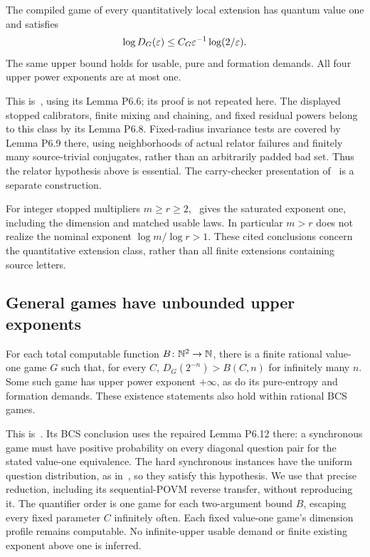 \begin{theorem}\label{thm:localcap}
The compiled game of every quantitatively local extension has quantum value one and satisfies
\[
 \log D_G(\varepsilon)\le C_G\varepsilon^{-1}\log(2/\varepsilon).
\]
The same upper bound holds for usable, pure and formation demands. All four upper power exponents are at most one.
\end{theorem}
This is~\cite[Theorem P6.7]{UP}, using its Lemma P6.6; its proof is not repeated here. The displayed stopped calibrators, finite mixing and chaining, and fixed residual powers belong to this class by its Lemma P6.8. Fixed-radius invariance tests are covered by Lemma P6.9 there, using neighborhoods of actual relator failures and finitely many source-trivial conjugates, rather than an arbitrarily padded bad set. Thus the relator hypothesis above is essential. The carry-checker presentation of~\cite[Section Q1]{UP} is a separate construction.

For integer stopped multipliers $m\ge r\ge2$,~\cite[Corollary P6.10]{UP} gives the saturated exponent one, including the dimension and matched usable laws. In particular $m>r$ does not realize the nominal exponent $\log m/\log r>1$. These cited conclusions concern the quantitative extension class, rather than all finite extensions containing source letters.

\subsection{General games have unbounded upper exponents}
\begin{theorem}\label{thm:unbounded}
For each total computable function $B\colon\mathbb N^2\to\mathbb N$, there is a finite rational value-one game $G$ such that, for every $C$, $D_G(2^{-n})>B(C,n)$ for infinitely many $n$. Some such game has upper power exponent $+\infty$, as do its pure-entropy and formation demands. These existence statements also hold within rational BCS games.
\end{theorem}
This is~\cite[Theorem P6.11]{UP}. Its BCS conclusion uses the repaired Lemma P6.12 there: a synchronous game must have positive probability on every diagonal question pair for the stated value-one equivalence. The hard synchronous instances have the uniform question distribution, as in~\cite[Theorem 1.6 and the proof of Lemma 6.7]{MNY}, so they satisfy this hypothesis. We use that precise reduction, including its sequential-POVM reverse transfer, without reproducing it. The quantifier order is one game for each two-argument bound $B$, escaping every fixed parameter $C$ infinitely often. Each fixed value-one game's dimension profile remains computable. No infinite-upper usable demand or finite existing exponent above one is inferred.


